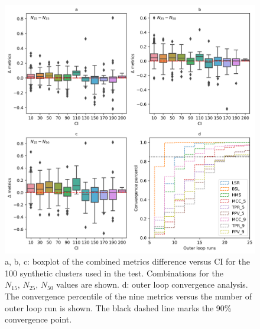 \documentclass{aa}
\begin{document}
 \begin{figure}
 \includegraphics[width=\hsize]{figs/upmask_N.png}
 \caption{a, b, c: boxplot of the combined metrics difference versus CI for the
 100 synthetic clusters used in the test. Combinations for the
 $N_{15},\,N_{25},\,N_{50}$ values are shown.
 d: outer loop convergence analysis. The convergence percentile
 of the nine metrics versus the number of outer loop run is shown. The black
 dashed line marks the 90\% convergence point.}
 \label{fig:UPMASKruns}
 \end{figure}
\end{document}
